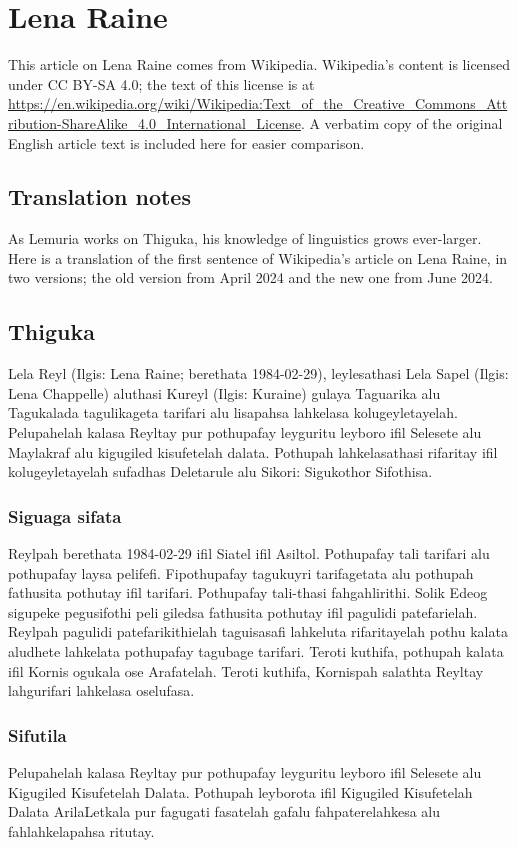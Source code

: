 \chapter{Lena Raine}
This article on Lena Raine comes from Wikipedia. Wikipedia's content is licensed under CC BY-SA 4.0; the text of this license is at \url{https://en.wikipedia.org/wiki/Wikipedia:Text_of_the_Creative_Commons_Attribution-ShareAlike_4.0_International_License}. A verbatim copy of the original English article text is included here for easier comparison.

\section{Translation notes}
As Lemuria works on Thiguka, his knowledge of linguistics grows ever-larger.
Here is a translation of the first sentence of Wikipedia's article on Lena Raine, in two versions; the old version from April 2024 and the new one from June 2024.

\section{Thiguka}
Lela Reyl (Ilgis: Lena Raine; berethata 1984-02-29), leylesathasi Lela Sapel (Ilgis: Lena Chappelle) aluthasi Kureyl (Ilgis: Kuraine) gulaya Taguarika alu Tagukalada tagulikageta tarifari alu lisapahsa lahkelasa kolugeyletayelah.
Pelupahelah kalasa Reyltay pur pothupafay leyguritu leyboro ifil Selesete alu Maylakraf alu kigugiled kisufetelah dalata.
Pothupah lahkelasathasi rifaritay ifil kolugeyletayelah sufadhas Deletarule alu Sikori: Sigukothor Sifothisa. 

\subsection{Siguaga sifata}
Reylpah berethata 1984-02-29 ifil Siatel ifil Asiltol.
Pothupafay tali tarifari alu pothupafay laysa pelifefi.
Fipothupafay tagukuyri tarifagetata alu pothupah fathusita pothutay ifil tarifari.
Pothupafay tali-thasi fahgahlirithi.
Solik Edeog sigupeke pegusifothi peli giledsa fathusita pothutay ifil pagulidi patefarielah.
Reylpah pagulidi patefarikithielah taguisasafi lahkeluta rifaritayelah pothu kalata aludhete lahkelata pothupafay tagubage tarifari.
Teroti kuthifa, pothupah kalata ifil Kornis ogukala ose Arafatelah.
Teroti kuthifa, Kornispah salathta Reyltay lahgurifari lahkelasa oselufasa.

\subsection{Sifutila}
Pelupahelah kalasa Reyltay pur pothupafay leyguritu leyboro ifil Selesete alu Kigugiled Kisufetelah Dalata. 
Pothupah leyborota ifil Kigugiled Kisufetelah Dalata ArilaLetkala pur fagugati fasatelah gafalu fahpaterelahkesa alu fahlahkelapahsa ritutay.

